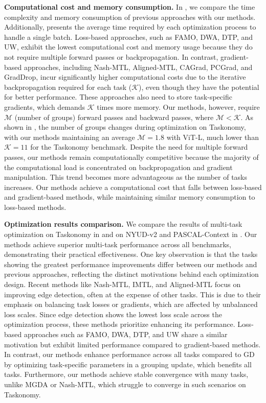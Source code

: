 \textbf{Computational cost and memory consumption.} In , we compare the time complexity and memory consumption of previous approaches with our methods. Additionally,  presents the average time required by each optimization process to handle a single batch. Loss-based approaches, such as FAMO, DWA, DTP, and UW, exhibit the lowest computational cost and memory usage because they do not require multiple forward passes or backpropagation. In contrast, gradient-based approaches, including Nash-MTL, Aligned-MTL, CAGrad, PCGrad, and GradDrop, incur significantly higher computational costs due to the iterative backpropagation required for each task ($\mathcal{K}$), even though they have the potential for better performance. These approaches also need to store task-specific gradients, which demands $\mathcal{K}$ times more memory. Our methods, however, require $\mathcal{M}$ (number of groups) forward passes and backward passes, where $\mathcal{M}<\mathcal{K}$. As shown in , the number of groups changes during optimization on Taskonomy, with our methods maintaining an average $\mathcal{M}=1.8$ with ViT-L, much lower than $\mathcal{K}=11$ for the Taskonomy benchmark. Despite the need for multiple forward passes, our methods remain computationally competitive because the majority of the computational load is concentrated on backpropagation and gradient manipulation. This trend becomes more advantageous as the number of tasks increases. Our methods achieve a computational cost that falls between loss-based and gradient-based methods, while maintaining similar memory consumption to loss-based methods.

\textbf{Optimization results comparison.} We compare the results of multi-task optimization on Taskonomy in  and on NYUD-v2 and PASCAL-Context in . Our methods achieve superior multi-task performance across all benchmarks, demonstrating their practical effectiveness. One key observation is that the tasks showing the greatest performance improvements differ between our methods and previous approaches, reflecting the distinct motivations behind each optimization design. Recent methods like Nash-MTL, IMTL, and Aligned-MTL focus on improving edge detection, often at the expense of other tasks. This is due to their emphasis on balancing task losses or gradients, which are affected by unbalanced loss scales. Since edge detection shows the lowest loss scale across the optimization process, these methods prioritize enhancing its performance. Loss-based approaches such as FAMO, DWA, DTP, and UW share a similar motivation but exhibit limited performance compared to gradient-based methods. In contrast, our methods enhance performance across all tasks compared to GD by optimizing task-specific parameters in a grouping update, which benefits all tasks. Furthermore, our methods achieve stable convergence with many tasks, unlike MGDA or Nash-MTL, which struggle to converge in such scenarios on Taskonomy.


